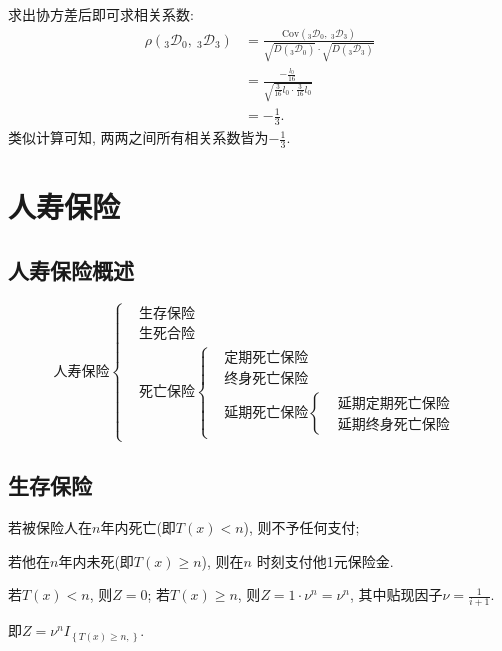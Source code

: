 \documentclass[lang=cn,10pt]{elegantbook}
\begin{document}
\begin{solution}
求出协方差后即可求相关系数:
\begin{align*}
    \rho(_{3}\mathscr D _{0},\ _{3}\mathscr D _{3}) & =\frac{\text{Cov}(_{3}\mathscr D_{0},\ _{3}\mathscr D _{3})}{\sqrt{D(_{3}\mathscr D _{0})}\cdot \sqrt{D(_{3}\mathscr D _{3})}} \\
                                                    & =\frac{-\frac{l_{0}}{16}}{\sqrt{\frac{3}{16}l_{0}\cdot \frac{3}{16}l_{0}}}                                                     \\
                                                    & =-\frac{1}{3}.
\end{align*}
类似计算可知, 两两之间所有相关系数皆为$-\frac{1}{3}$.
\end{solution}

\chapter{人寿保险}
\section{人寿保险概述}
\begin{equation*}
    \text{人寿保险}
    \begin{cases}
         & \text{生存保险} \\
         & \text{生死合险} \\
         & \text{死亡保险}
		\begin{cases}
         & \text{定期死亡保险}  \\
         & \text{终身死亡保险}                   \\
         & \text{延期死亡保险}
		 \begin{cases}
         & \text{延期定期死亡保险} \\
         & \text{延期终身死亡保险}
    	 \end{cases}
    	\end{cases}
    \end{cases}
\end{equation*}

\section{生存保险}
\begin{definition}[支付现值]
	若被保险人在$n$年内死亡(即$T(x)<n$), 则不予任何支付;

若他在$n$年内未死(即$T(x)\geqslant n$), 则在$n$ 时刻支付他1元保险金.

若$T(x)<n$, 则$Z=0$; 若$T(x)\geqslant n$, 则$Z=1\cdot \nu^n=\nu^n$, 其中贴现因子$\nu=\frac{1}{i+1}.$

即$Z=\nu^nI_{\left\{ T\left( x \right) \geqslant n, \right\}}$.
\end{definition}
\end{document}
